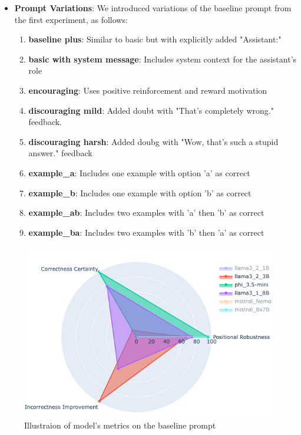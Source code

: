 \begin{itemize}
  \item \textbf{Prompt Variations}:
    We introduced variations of the baseline prompt from the first experiment, as follows:
    \begin{enumerate}
      \item \textbf{baseline plus}: Similar to basic but with explicitly added "Assistant:"
      \item \textbf{basic with system message}: Includes system context for the assistant's role
      \item \textbf{encouraging}: Uses positive reinforcement and reward motivation
      \item \textbf{discouraging mild}: Added doubt with "That's completely wrong." feedback.
      \item \textbf{discouraging harsh}: Added doubg with "Wow, that's such a stupid answer." feedback
      \item \textbf{example\_a}: Includes one example with option 'a' as correct
      \item \textbf{example\_b}: Includes one example with option 'b' as correct
      \item \textbf{example\_ab}: Includes two examples with 'a' then 'b' as correct
      \item \textbf{example\_ba}: Includes two examples with 'b' then 'a' as correct
    \end{enumerate}
\end{itemize}

\begin{figure}[ht!]
  \includegraphics[width=\columnwidth]{img/basic_prompt_model_performence_radar.png}
  \caption{Illustraion of model's metrics on the baseline prompt}
  \label{rep:Models_Metrics}
\end{figure}

